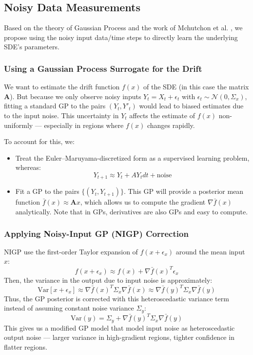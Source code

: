 \documentclass[a4paper, 11pt]{article}
\begin{document}
\begin{sloppypar}
\subsection{Noisy Data Measurements}
Based on the theory of Gaussian Process and the work of Mchutchon et al. \cite{NIPS2011_a8e864d0},
we propose using the noisy input data/time steps to directly learn the underlying SDE's parameters.

\subsubsection{Using a Gaussian Process Surrogate for the Drift}
We want to estimate the drift function $f(x)$ of the SDE (in this case the matrix $\mathbf{A}$).
But because we only observe noisy inputs $Y_t = X_t + \epsilon_t$ with $\epsilon_t \sim \mathcal{N}(0, \Sigma_x)$,
fitting a standard GP to the pairs $(Y_t, Y'_t)$ would lead to biased estimates due to the input
noise. This uncertainty in $Y_t$ affects the estimate of $f(x)$ non-uniformly — especially in regions
where $f(x)$ changes rapidly.

To account for this, we:
\begin{itemize}
  \item Treat the Euler–Maruyama-discretized form as a supervised learning problem, whereas:
        \[
          Y_{t+1} \approx Y_t + AY_tdt + \text{noise}
        \]
  \item Fit a GP to the pairs $\{(Y_t, Y_{t+1})\}$. This GP will provide a posterior mean function
        $\bar{f}(x) \approx \mathbf{A}x$, which allows us to compute the gradient $\nabla \bar{f}(x)$
        analytically. Note that in GPs, derivatives are also GPs and easy to compute.
\end{itemize}

\subsubsection{Applying Noisy-Input GP (NIGP) Correction}
NIGP use the first-order Taylor expansion of $f(x + \epsilon_x)$ around the mean input $x$:
\[
  f(x + \epsilon_x) \approx f(x) + \nabla\bar{f}(x)^T \epsilon_x
\]
Then, the variance in the output due to input noise is approximately:
\[
  \text{Var}[x + \epsilon_x] \approx \nabla\bar{f}(x)^T \Sigma_x \nabla\bar{f}(x) \approx \nabla\bar{f}(y)^T \Sigma_x \nabla\bar{f}(y)
\]
Thus, the GP posterior is corrected with this heteroscedastic variance term instead of assuming
constant noise variance $\Sigma_y$:
\[
  \text{Var}(y) = \Sigma_y + \nabla\bar{f}(y)^T \Sigma_x \nabla\bar{f}(y)
\]
This gives us a modified GP model that model input noise as heteroscedastic output noise — larger
variance in high-gradient regions, tighter confidence in flatter regions.


\end{sloppypar}
\end{document}
